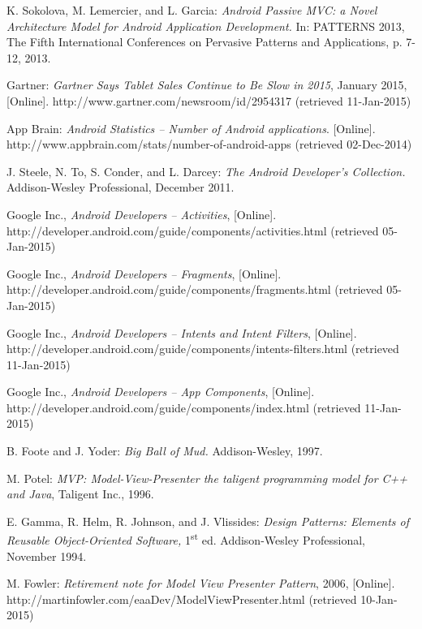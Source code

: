 \begin{thebibliography}{1}

K. Sokolova, M. Lemercier, and L. Garcia: \emph{Android Passive MVC: a Novel Architecture Model for Android Application Development.} In: PATTERNS 2013, The Fifth International Conferences on Pervasive Patterns and Applications, p. 7-12, 2013.

Gartner: \emph{Gartner Says Tablet Sales Continue to Be Slow in 2015}, January 2015, 
[Online]. http://www.gartner.com/newsroom/id/2954317 (retrieved 11-Jan-2015)

App Brain: \emph{Android Statistics -- Number of Android applications}. 
[Online]. http://www.appbrain.com/stats/number-of-android-apps (retrieved 02-Dec-2014)

J. Steele, N. To, S. Conder, and L. Darcey: \emph{The Android Developer's Collection.} Addison-Wesley Professional, December 2011.

Google Inc., \emph{Android Developers -- Activities},
[Online]. http://developer.android.com/guide/components/activities.html (retrieved 05-Jan-2015)

Google Inc., \emph{Android Developers -- Fragments},
[Online]. http://developer.android.com/guide/components/fragments.html (retrieved 05-Jan-2015)

Google Inc., \emph{Android Developers -- Intents and Intent Filters},
[Online]. http://developer.android.com/guide/components/intents-filters.html (retrieved 11-Jan-2015)

Google Inc., \emph{Android Developers -- App Components},
[Online]. http://developer.android.com/guide/components/index.html (retrieved 11-Jan-2015)

B. Foote and J. Yoder: \emph{Big Ball of Mud.} Addison-Wesley, 1997.

M. Potel: \emph{MVP: Model-View-Presenter the taligent programming model for C++ and Java}, Taligent Inc., 1996.

E. Gamma, R. Helm, R. Johnson, and J. Vlissides: \emph{Design Patterns: Elements of Reusable Object-Oriented Software,} 1\textsuperscript{st} ed. Addison-Wesley Professional, November 1994.

M. Fowler: \emph{Retirement note for Model View Presenter Pattern}, 2006, 
[Online]. http://martinfowler.com/eaaDev/ModelViewPresenter.html (retrieved 10-Jan-2015)


\end{thebibliography}
